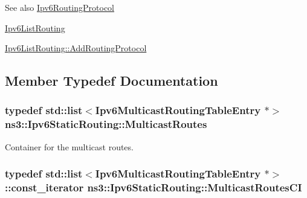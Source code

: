 \begin{DoxySeeAlso}{See also}
\hyperlink{classns3_1_1Ipv6RoutingProtocol}{Ipv6\+Routing\+Protocol} 

\hyperlink{classns3_1_1Ipv6ListRouting}{Ipv6\+List\+Routing} 

\hyperlink{classns3_1_1Ipv6ListRouting_af2f9faf061ec907349d7287475fe73bc}{Ipv6\+List\+Routing\+::\+Add\+Routing\+Protocol} 
\end{DoxySeeAlso}


\subsection{Member Typedef Documentation}
\subsubsection[{\texorpdfstring{Multicast\+Routes}{MulticastRoutes}}]{\setlength{\rightskip}{0pt plus 5cm}typedef {\bf std\+::list}$<${\bf Ipv6\+Multicast\+Routing\+Table\+Entry} $\ast$$>$ {\bf ns3\+::\+Ipv6\+Static\+Routing\+::\+Multicast\+Routes}\hspace{0.3cm}{\ttfamily [private]}}\hypertarget{classns3_1_1Ipv6StaticRouting_a02421205cb9361483594fb8bd2286b12}{}\label{classns3_1_1Ipv6StaticRouting_a02421205cb9361483594fb8bd2286b12}


Container for the multicast routes. 

\subsubsection[{\texorpdfstring{Multicast\+Routes\+CI}{MulticastRoutesCI}}]{\setlength{\rightskip}{0pt plus 5cm}typedef {\bf std\+::list}$<${\bf Ipv6\+Multicast\+Routing\+Table\+Entry} $\ast$$>$\+::const\+\_\+iterator {\bf ns3\+::\+Ipv6\+Static\+Routing\+::\+Multicast\+Routes\+CI}\hspace{0.3cm}{\ttfamily [private]}}\hypertarget{classns3_1_1Ipv6StaticRouting_a92c49caeb07b0d87fc1945a828ba33eb}{}\label{classns3_1_1Ipv6StaticRouting_a92c49caeb07b0d87fc1945a828ba33eb}


